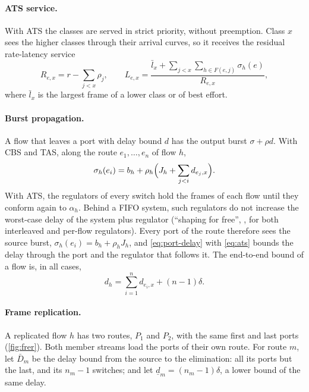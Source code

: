 \paragraph{ATS service.} With ATS the classes are served in strict
priority, without preemption. Class $x$ sees the higher classes through
their arrival curves, so it receives the residual rate-latency service
\cite{leboudec2001network}
\begin{equation}
R_{e,x}=r-\sum_{j<x}\rho_j,\qquad
L_{e,x}=\frac{\bar l_x+\sum_{j<x}\sum_{h\in F(e,j)}\sigma_h(e)}{R_{e,x}},
\label{eq:ats}
\end{equation}
where $\bar l_x$ is the largest frame of a lower class or of best effort.

\paragraph{Burst propagation.} A flow that leaves a port with delay bound
$d$ has the output burst $\sigma+\rho d$. With CBS and TAS, along the
route $e_1,\dots,e_n$ of flow $h$,
\begin{equation}
\sigma_h(e_i)=b_h+\rho_h\Bigl(J_h+\sum_{j<i}d_{e_j,x}\Bigr).
\label{eq:burst}
\end{equation}
With ATS, the regulators of every switch hold the frames of each flow until
they conform again to $\alpha_h$. Behind a FIFO system, such regulators do
not increase the worst-case delay of the system plus regulator
(``shaping for free'', \cite{leboudec2018theory}, for both interleaved and
per-flow regulators). Every port of the route therefore sees the source
burst, $\sigma_h(e_i)=b_h+\rho_hJ_h$, and \cref{eq:port-delay} with
\cref{eq:ats} bounds the delay through the port and the regulator that
follows it. The end-to-end bound of a flow is, in all cases,
\begin{equation}
d_h=\sum_{i=1}^{n}d_{e_i,x}+(n-1)\delta .
\label{eq:flow-delay}
\end{equation}

\paragraph{Frame replication.} A replicated flow $h$ has two routes, $P_1$
and $P_2$, with the same first and last ports (\cref{fig:frer}). Both
member streams load the ports of their own route. For route $m$, let
$\bar D_m$ be the delay bound from the source to the elimination: all its
ports but the last, and its $n_m-1$ switches; and let $\underline{d}_m=
(n_m-1)\delta$, a lower bound of the same delay.

